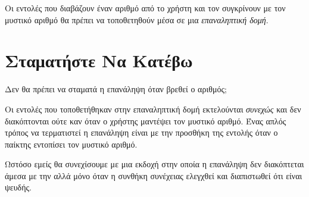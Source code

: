 \documentclass[a4paper,11pt,oneside]{book}
\begin{document}

Οι εντολές που διαβάζουν έναν αριθμό από το χρήστη και τον συγκρίνουν με τον μυστικό αριθμό θα πρέπει να τοποθετηθούν μέσα σε μια \emph{επαναληπτική δομή}.



\section{Σταματήστε Να Κατέβω}

\begin{question}
Δεν θα πρέπει να σταματά η επανάληψη όταν βρεθεί ο αριθμός;
\end{question}

Οι εντολές που τοποθετήθηκαν στην επαναληπτική δομή εκτελούνται \emph{συνεχώς} και δεν διακόπτονται ούτε καν όταν ο χρήστης μαντέψει τον μυστικό αριθμό. Ένας απλός τρόπος να τερματιστεί η επανάληψη είναι με την προσθήκη της εντολής  όταν ο παίκτης εντοπίσει τον μυστικό αριθμό.

\clearpage
{} 

Ωστόσο εμείς θα συνεχίσουμε με μια εκδοχή στην οποία η επανάληψη δεν διακόπτεται άμεσα με την  αλλά μόνο όταν η συνθήκη συνέχειας ελεγχθεί και διαπιστωθεί ότι είναι ψευδής.

\end{document}
